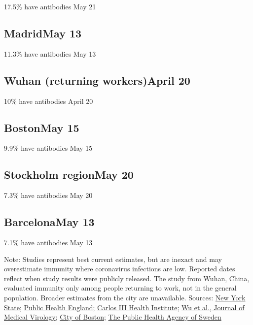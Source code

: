 17.5\% have antibodies May 21

\hypertarget{madridmay-13}{%
\subsection{MadridMay 13}\label{madridmay-13}}

11.3\% have antibodies May 13

\hypertarget{wuhan-returning-workersapril-20}{%
\subsection{Wuhan (returning workers)April
20}\label{wuhan-returning-workersapril-20}}

10\% have antibodies April 20

\hypertarget{bostonmay-15}{%
\subsection{BostonMay 15}\label{bostonmay-15}}

9.9\% have antibodies May 15

\hypertarget{stockholm-regionmay-20}{%
\subsection{Stockholm regionMay 20}\label{stockholm-regionmay-20}}

7.3\% have antibodies May 20

\hypertarget{barcelonamay-13}{%
\subsection{BarcelonaMay 13}\label{barcelonamay-13}}

7.1\% have antibodies May 13

Note: Studies represent best current estimates, but are inexact and may
overestimate immunity where coronavirus infections are low. Reported
dates reflect when study results were publicly released. The study from
Wuhan, China, evaluated immunity only among people returning to work,
not in the general population. Broader estimates from the city are
unavailable. Sources:
\href{https://www.governor.ny.gov/news/amid-ongoing-covid-19-pandemic-governor-cuomo-announces-results-completed-antibody-testing}{New
York State};
\href{https://www.gov.uk/government/publications/national-covid-19-surveillance-reports/sero-surveillance-of-covid-19}{Public
Health England};
\href{https://www.lamoncloa.gob.es/serviciosdeprensa/notasprensa/sanidad14/Documents/2020/130520-ENE-COVID_Informe1.pdf}{Carlos
III Health Institute};
\href{https://onlinelibrary.wiley.com/doi/10.1002/jmv.25904}{Wu et al.,
Journal of Medical Virology};
\href{https://www.boston.gov/news/results-released-antibody-and-covid-19-testing-boston-residents}{City
of Boston};
\href{https://www.folkhalsomyndigheten.se/nyheter-och-press/nyhetsarkiv/2020/maj/forsta-resultaten-fran-pagaende-undersokning-av-antikroppar-for-covid-19-virus/}{The
Public Health Agency of Sweden}

